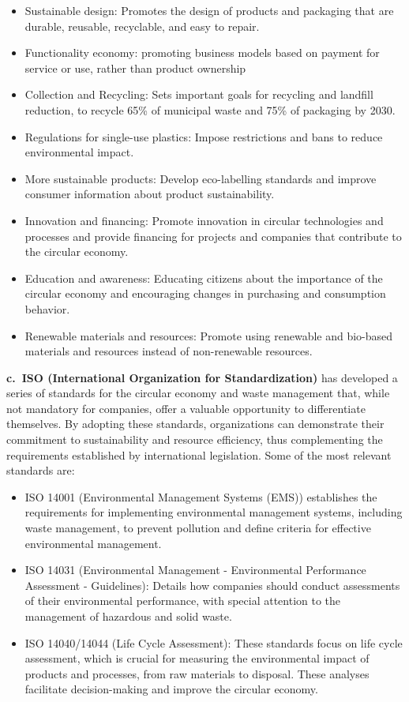 \documentclass[
  12pt,
  oneside]{book}
\providecommand{\tightlist}{%
  \setlength{\itemsep}{0pt}\setlength{\parskip}{0pt}}
\begin{document}
\begin{itemize}
\tightlist
\item
  Sustainable design: Promotes the design of products and packaging that
  are durable, reusable, recyclable, and easy to repair.
\item
  Functionality economy: promoting business models based on payment for
  service or use, rather than product ownership
\item
  Collection and Recycling: Sets important goals for recycling and
  landfill reduction, to recycle 65\% of municipal waste and 75\% of
  packaging by 2030.
\item
  Regulations for single-use plastics: Impose restrictions and bans to
  reduce environmental impact.
\item
  More sustainable products: Develop eco-labelling standards and improve
  consumer information about product sustainability.
\item
  Innovation and financing: Promote innovation in circular technologies
  and processes and provide financing for projects and companies that
  contribute to the circular economy.
\item
  Education and awareness: Educating citizens about the importance of
  the circular economy and encouraging changes in purchasing and
  consumption behavior.
\item
  Renewable materials and resources: Promote using renewable and
  bio-based materials and resources instead of non-renewable resources.
\end{itemize}

\textbf{c.~ISO (International Organization for Standardization) }has
developed a series of standards for the circular economy and waste
management that, while not mandatory for companies, offer a valuable
opportunity to differentiate themselves. By adopting these standards,
organizations can demonstrate their commitment to sustainability and
resource efficiency, thus complementing the requirements established by
international legislation. Some of the most relevant standards are:

\begin{itemize}
\tightlist
\item
  ISO 14001 (Environmental Management Systems (EMS)) establishes the
  requirements for implementing environmental management systems,
  including waste management, to prevent pollution and define criteria
  for effective environmental management.
\item
  ISO 14031 (Environmental Management - Environmental Performance
  Assessment - Guidelines): Details how companies should conduct
  assessments of their environmental performance, with special attention
  to the management of hazardous and solid waste.
\item
  ISO 14040/14044 (Life Cycle Assessment): These standards focus on life
  cycle assessment, which is crucial for measuring the environmental
  impact of products and processes, from raw materials to disposal.
  These analyses facilitate decision-making and improve the circular
  economy.
\end{itemize}
\end{document}
